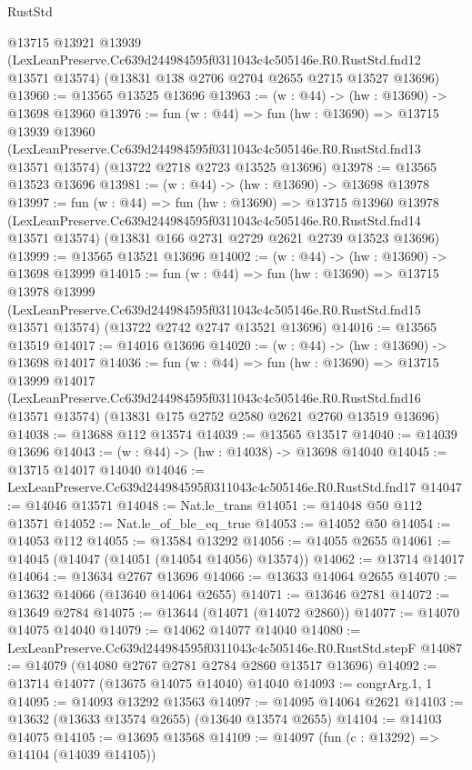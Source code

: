 \begin{lexlean}{RustStd}
\begin{coremodule}
  @13715
    @13921
    @13939
    (LexLeanPreserve.Cc639d244984595f0311043c4c505146e.R0.RustStd.fnd12 @13571 @13574)
    (@13831 @138 @2706 @2704 @2655 @2715 @13527 @13696)
@13960 := @13565 @13525 @13696
@13963 := (w : @44) -> (hw : @13690) -> @13698 @13960
@13976 := fun (w : @44) =>
  fun (hw : @13690) =>
  @13715
    @13939
    @13960
    (LexLeanPreserve.Cc639d244984595f0311043c4c505146e.R0.RustStd.fnd13 @13571 @13574)
    (@13722 @2718 @2723 @13525 @13696)
@13978 := @13565 @13523 @13696
@13981 := (w : @44) -> (hw : @13690) -> @13698 @13978
@13997 := fun (w : @44) =>
  fun (hw : @13690) =>
  @13715
    @13960
    @13978
    (LexLeanPreserve.Cc639d244984595f0311043c4c505146e.R0.RustStd.fnd14 @13571 @13574)
    (@13831 @166 @2731 @2729 @2621 @2739 @13523 @13696)
@13999 := @13565 @13521 @13696
@14002 := (w : @44) -> (hw : @13690) -> @13698 @13999
@14015 := fun (w : @44) =>
  fun (hw : @13690) =>
  @13715
    @13978
    @13999
    (LexLeanPreserve.Cc639d244984595f0311043c4c505146e.R0.RustStd.fnd15 @13571 @13574)
    (@13722 @2742 @2747 @13521 @13696)
@14016 := @13565 @13519
@14017 := @14016 @13696
@14020 := (w : @44) -> (hw : @13690) -> @13698 @14017
@14036 := fun (w : @44) =>
  fun (hw : @13690) =>
  @13715
    @13999
    @14017
    (LexLeanPreserve.Cc639d244984595f0311043c4c505146e.R0.RustStd.fnd16 @13571 @13574)
    (@13831 @175 @2752 @2580 @2621 @2760 @13519 @13696)
@14038 := @13688 @112 @13574
@14039 := @13565 @13517
@14040 := @14039 @13696
@14043 := (w : @44) -> (hw : @14038) -> @13698 @14040
@14045 := @13715 @14017 @14040
@14046 := LexLeanPreserve.Cc639d244984595f0311043c4c505146e.R0.RustStd.fnd17
@14047 := @14046 @13571
@14048 := Nat.le_trans
@14051 := @14048 @50 @112 @13571
@14052 := Nat.le_of_ble_eq_true
@14053 := @14052 @50
@14054 := @14053 @112
@14055 := @13584 @13292
@14056 := @14055 @2655
@14061 := @14045 (@14047 (@14051 (@14054 @14056) @13574))
@14062 := @13714 @14017
@14064 := @13634 @2767 @13696
@14066 := @13633 @14064 @2655
@14070 := @13632 @14066 (@13640 @14064 @2655)
@14071 := @13646 @2781
@14072 := @13649 @2784
@14075 := @13644 (@14071 (@14072 @2860))
@14077 := @14070 @14075 @14040
@14079 := @14062 @14077 @14040
@14080 := LexLeanPreserve.Cc639d244984595f0311043c4c505146e.R0.RustStd.stepF
@14087 := @14079 (@14080 @2767 @2781 @2784 @2860 @13517 @13696)
@14092 := @13714 @14077 (@13675 @14075 @14040) @14040
@14093 := congrArg.{1, 1}
@14095 := @14093 @13292 @13563
@14097 := @14095 @14064 @2621
@14103 := @13632 (@13633 @13574 @2655) (@13640 @13574 @2655)
@14104 := @14103 @14075
@14105 := @13695 @13568
@14109 := @14097 (fun (c : @13292) => @14104 (@14039 @14105))

\end{coremodule}
\end{lexlean}
